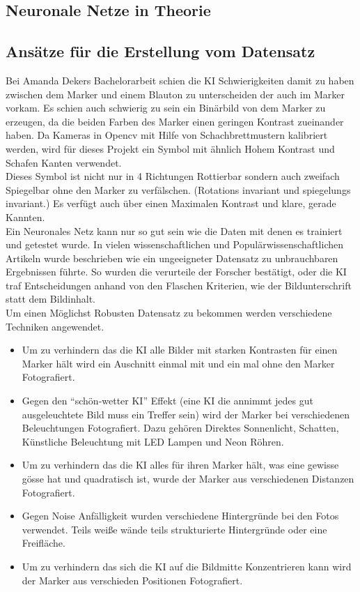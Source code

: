 \documentclass[conference]{IEEEtran}
\begin{document}
\subsection{Neuronale Netze in Theorie}	%

\subsection{Ansätze für die Erstellung vom Datensatz}	%

Bei Amanda Dekers Bachelorarbeit schien die KI Schwierigkeiten damit zu haben zwischen  dem Marker und einem Blauton zu unterscheiden der auch im Marker vorkam. Es schien auch schwierig zu sein ein Binärbild von dem Marker zu erzeugen, da die beiden Farben des Marker einen geringen Kontrast zueinander haben. Da Kameras in Opencv mit Hilfe von Schachbrettmustern kalibriert werden, wird für dieses Projekt ein Symbol mit ähnlich Hohem Kontrast und Schafen Kanten verwendet.\\
 Dieses Symbol ist nicht nur in 4 Richtungen Rottierbar sondern auch zweifach Spiegelbar ohne den Marker zu verfälschen. (Rotations invariant und spiegelungs invariant.) Es verfügt auch über einen Maximalen Kontrast und klare, gerade Kannten. \\
 \noindent
Ein Neuronales Netz kann nur so gut sein wie die Daten mit denen es trainiert und getestet wurde. In vielen wissenschaftlichen und Populärwissenschaftlichen Artikeln wurde beschrieben wie ein ungeeigneter Datensatz zu unbrauchbaren Ergebnissen führte. So wurden die verurteile der Forscher bestätigt, oder die KI traf Entscheidungen anhand von den Flaschen Kriterien, wie der Bildunterschrift statt dem Bildinhalt. \\
Um einen Möglichst Robusten Datensatz zu bekommen  werden verschiedene Techniken angewendet.
\begin{itemize}
	\item Um zu verhindern das die KI alle Bilder mit starken Kontrasten für einen Marker hält wird ein Auschnitt einmal mit und ein mal ohne den Marker Fotografiert.
	\item Gegen den  "`schön-wetter KI"' Effekt (eine KI die annimmt jedes gut ausgeleuchtete Bild muss ein Treffer sein) wird der Marker bei verschiedenen Beleuchtungen Fotografiert. Dazu gehören Direktes Sonnenlicht, Schatten, Künstliche Beleuchtung mit LED Lampen und Neon Röhren. 
	\item Um zu verhindern das die KI alles für ihren Marker hält, was eine gewisse gösse hat und quadratisch ist, wurde der Marker aus verschiedenen Distanzen Fotografiert. 
	\item Gegen Noise Anfälligkeit wurden verschiedene Hintergründe bei den Fotos verwendet. Teils weiße wände teils strukturierte Hintergründe oder eine Freifläche. 
	\item Um zu verhindern das sich die KI auf die Bildmitte Konzentrieren kann wird der Marker aus verschieden Positionen Fotografiert. 
\end{itemize}
\end{document}
